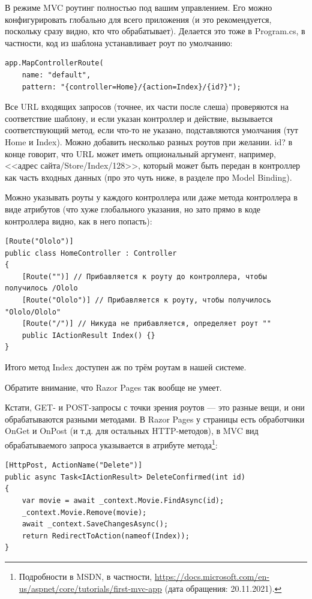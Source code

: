 \documentclass[a5paper]{article}
\begin{document}
В режиме MVC роутинг полностью под вашим управлением. Его можно конфигурировать глобально для всего приложения (и это рекомендуется, поскольку сразу видно, кто что обрабатывает). Делается это тоже в Program.cs, в частности, код из шаблона устанавливает роут по умолчанию:

\begin{verbatim}
app.MapControllerRoute(
    name: "default",
    pattern: "{controller=Home}/{action=Index}/{id?}");
\end{verbatim}

Все URL входящих запросов (точнее, их части после слеша) проверяются на соответствие шаблону, и если указан контроллер и действие, вызывается соответствующий метод, если что-то не указано, подставляются умолчания (тут Home и Index). Можно добавить несколько разных роутов при желании. id? в конце говорит, что URL может иметь опциональный аргумент, например, <<адрес сайта/Store/Index/128>>, который может быть передан в контроллер как часть входных данных (про это чуть ниже, в разделе про Model Binding).

Можно указывать роуты у каждого контроллера или даже метода контроллера в виде атрибутов (что хуже глобального указания, но зато прямо в коде контроллера видно, как в него попасть):

\begin{verbatim}
[Route("Ololo")]
public class HomeController : Controller
{
    [Route("")] // Прибавляется к роуту до контроллера, чтобы получилось /Ololo
    [Route("Ololo")] // Прибавляется к роуту, чтобы получилось "Ololo/Ololo"
    [Route("/")] // Никуда не прибавляется, определяет роут ""
    public IActionResult Index() {}
}
\end{verbatim}

Итого метод Index доступен аж по трём роутам в нашей системе.

Обратите внимание, что Razor Pages так вообще не умеет.

Кстати, GET- и POST-запросы с точки зрения роутов --- это разные вещи, и они обрабатываются разными методами. В Razor Pages у страницы есть обработчики OnGet и OnPost (и т.д. для остальных HTTP-методов), в MVC вид обрабатываемого запроса указывается в атрибуте метода\footnote{Подробности в MSDN, в частности, \url{https://docs.microsoft.com/en-us/aspnet/core/tutorials/first-mvc-app} (дата обращения: 20.11.2021).}:

\begin{verbatim}
[HttpPost, ActionName("Delete")]
public async Task<IActionResult> DeleteConfirmed(int id)
{
    var movie = await _context.Movie.FindAsync(id);
    _context.Movie.Remove(movie);
    await _context.SaveChangesAsync();
    return RedirectToAction(nameof(Index));
}
\end{verbatim}
\end{document}
